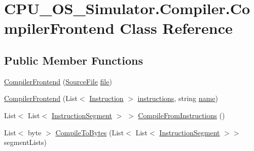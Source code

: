 \hypertarget{class_c_p_u___o_s___simulator_1_1_compiler_1_1_compiler_frontend}{}\section{C\+P\+U\+\_\+\+O\+S\+\_\+\+Simulator.\+Compiler.\+Compiler\+Frontend Class Reference}
\label{class_c_p_u___o_s___simulator_1_1_compiler_1_1_compiler_frontend}
\subsection*{Public Member Functions}
\begin{DoxyCompactItemize}
\item 
\hyperlink{class_c_p_u___o_s___simulator_1_1_compiler_1_1_compiler_frontend_ac3122a57986de8d3bfb16a78af8e49a1}{Compiler\+Frontend} (\hyperlink{class_c_p_u___o_s___simulator_1_1_compiler_1_1_source_file}{Source\+File} \hyperlink{class_c_p_u___o_s___simulator_1_1_compiler_1_1_compiler_frontend_a57d54910e0df9189cf333b95d9123641}{file})
\item 
\hyperlink{class_c_p_u___o_s___simulator_1_1_compiler_1_1_compiler_frontend_a57babee24613e50fd2b9ed00578d707e}{Compiler\+Frontend} (List$<$ \hyperlink{class_c_p_u___o_s___simulator_1_1_c_p_u_1_1_instruction}{Instruction} $>$ \hyperlink{class_c_p_u___o_s___simulator_1_1_compiler_1_1_compiler_frontend_aec71846f593e4bdcbd7d63a49b3b25bd}{instructions}, string \hyperlink{class_c_p_u___o_s___simulator_1_1_compiler_1_1_compiler_frontend_a2b4facf897341f61d4db60dc7fdc67c4}{name})
\item 
List$<$ List$<$ \hyperlink{class_c_p_u___o_s___simulator_1_1_compiler_1_1_instruction_segment}{Instruction\+Segment} $>$ $>$ \hyperlink{class_c_p_u___o_s___simulator_1_1_compiler_1_1_compiler_frontend_abe29382de80d0cc7c0803477b6904850}{Compile\+From\+Instructions} ()
\item 
List$<$ byte $>$ \hyperlink{class_c_p_u___o_s___simulator_1_1_compiler_1_1_compiler_frontend_adcf4f8a206954bd1b4aa637430c630fb}{Compile\+To\+Bytes} (List$<$ List$<$ \hyperlink{class_c_p_u___o_s___simulator_1_1_compiler_1_1_instruction_segment}{Instruction\+Segment} $>$$>$ segment\+Lists)
\end{DoxyCompactItemize}
